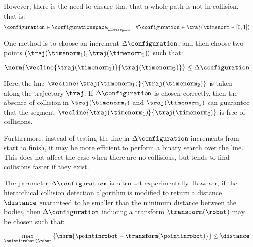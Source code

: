 				However, there is the need to ensure that that a whole path is
				not in collision, that is:
				\begin{equation}
					\configuration \in
							\configurationspace_{\freeregion}
					\quad
						\forall\configuration\in\traj(\timenorm \in [0, 1])
				\end{equation}

				One method is to choose an increment $\Delta\configuration$, and
				then choose two points $(\traj(\timenorm_1),
				\traj(\timenorm_2))$ such that:

				\begin{equation}
					\norm
					{%
						\vecline
						{%
							\traj(\timenorm_1)
						}
						{%
							\traj(\timenorm_2)
						}
					}
					\leq
					\Delta\configuration
				\end{equation}

				Here, the line
				\(
					\vecline
					{%
						\traj(\timenorm_1)
					}
					{%
						\traj(\timenorm_2)
					}
				\)
				is taken along the trajectory $\traj$. If
				$\Delta\configuration$ is chosen correctly, then the absence of
				collision in $\traj(\timenorm_1)$ and $\traj(\timenorm_2)$ can
				guarantee that the segment
				\(
					\vecline
					{%
						\traj(\timenorm_1)
					}
					{%
						\traj(\timenorm_2)
					}
				\)
				is free of collisions.

				Furthermore, instead
				of testing the line in $\Delta\configuration$ increments from
				start to finish, it may be more efficient to perform a binary
				search over the line. This does not affect the case when there
				are no collisions, but tends to find collisions faster if they
				exist.

				The parameter $\Delta\configuration$ is often set
				experimentally. However, if the hierarchical collision detection
				algorithm is modified to return a distance $\distance$
				guaranteed to be smaller than the minimum distance between the
				bodies, then $\Delta\configuration$ inducing a transform
				$\transform(\robot)$ may be chosen such that:

				\begin{equation}
					\max_{\pointinrobot\in\robot}
					\left\{%
						\norm
						{%
							\pointinrobot - \transform(\pointinrobot)
						}
					\right\}
					\leq
					\distance
				\end{equation}


